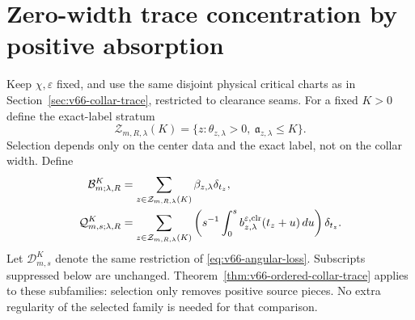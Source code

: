 \section{Zero-width trace concentration by positive absorption}
\label{sec:v67-stratified-trace}
Keep $\chi,\varepsilon$ fixed, and use the same disjoint physical
critical charts as in Section~\ref{sec:v66-collar-trace}, restricted
to clearance seams. For a fixed $K>0$ define the exact-label stratum
\[
 \mathcal Z_{m,R,\lambda}(K)
   =\{z:\theta_{z,\lambda}>0,\ \mathfrak a_{z,\lambda}\le K\}.
\]
Selection depends only on the center data and the exact label, not
on the collar width. Define
\begin{align}
 \mathcal B^K_{m;\lambda,R}
    &=\sum_{z\in\mathcal Z_{m,R,\lambda}(K)}
                   \beta_{z,\lambda}\delta_{t_z},\notag\\
 \mathcal Q^K_{m,s;\lambda,R}
    &=\sum_{z\in\mathcal Z_{m,R,\lambda}(K)}
       \left(s^{-1}\int_0^s b_{z,\lambda}^{\varepsilon,\mathrm{clr}}
                                      (t_z+u)\,du\right)\delta_{t_z}.
                                                        \label{eq:v67-stratified-traces}
\end{align}
Let $\mathcal D^K_{m,s}$ denote the same restriction of
\eqref{eq:v66-angular-loss}. Subscripts suppressed below are unchanged.
Theorem~\ref{thm:v66-ordered-collar-trace} applies to these subfamilies:
selection only removes positive source pieces. No extra regularity of
the selected family is needed for that comparison.

